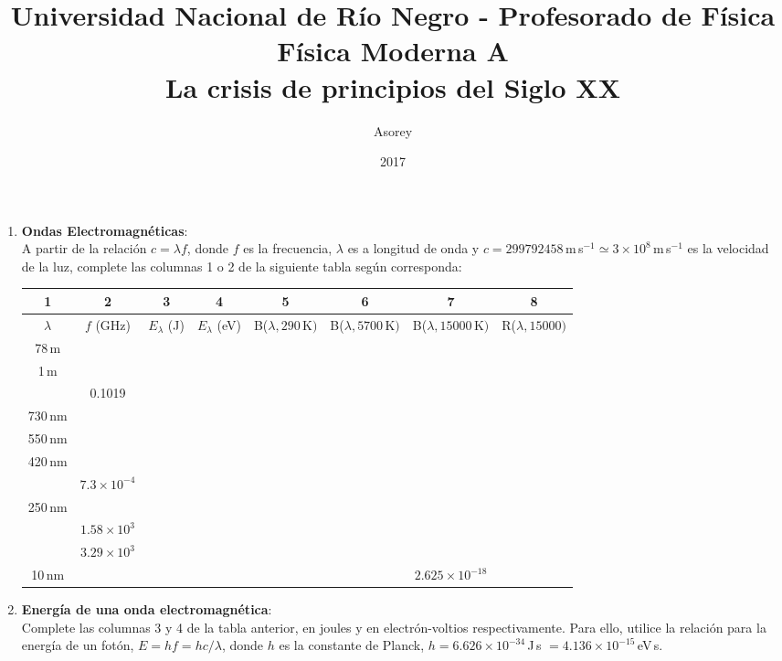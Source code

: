 \documentclass[a4paper,12pt]{article}
\begin{document}
\title{
{\normalsize{Universidad Nacional de Río Negro - Profesorado de Física}}\\
Física Moderna A \\ La crisis de principios del Siglo XX\\}
\author{Asorey}
\date{2017}
\maketitle

\begin{enumerate}
\setcounter{enumi}{0}      %

\item {\bf{Ondas Electromagnéticas}}:\\
	A partir de la relación $c = \lambda f$, donde $f$ es la frecuencia,
		$\lambda$ es a longitud de onda y $c=299792458$\,m\,s$^{-1} \simeq
		3\times 10^8$\,m\,s$^{-1}$ es la velocidad de la luz, complete las columnas 1 o 2 de la siguiente tabla según corresponda:
		\begin{center}
			\begin{tabular}{|c|c|c|c|c|c|c|c|}
				\hline
				1 & 2 & 3 & 4 & 5 & 6 & 7 & 8 \\
				\hline
				$\lambda$ & $f$ (GHz) & $E_\lambda$ (J) & $E_\lambda$ (eV) & B($\lambda, 290$\,K$)$ & B($\lambda, 5700$\,K$)$ & B($\lambda, 15000$\,K$)$ & R($\lambda,15000)$\\
				\hline
				78\,m & & & & & & & \\
				\hline
				1\,m & & & & & & & \\
				\hline
				 & 0.1019 & & & & & & \\
				\hline
				730\,nm & & & & & & & \\
				\hline
				550\,nm & & & & & & & \\
				\hline
				420\,nm & & & & & & & \\
				\hline
				& $7.3 \times 10^{-4}$ & & & & & & \\
				\hline
				250\,nm & & & & & & & \\
				\hline
				& $1.58 \times 10^{3}$ & & & & & & \\
				\hline
				& $3.29 \times 10^{3}$ & & & & & & \\
				\hline
				10\,nm & & & & & & $2.625 \times 10^{-18}$ & \\
				\hline
			\end{tabular}
		\end{center}
		
\item {\bf{Energía de una onda electromagnética}}:\\
	Complete las columnas 3 y 4 de la tabla anterior, en joules y en
		electrón-voltios respectivamente. Para ello, utilice la relación para
		la energía de un fotón, $E = h f = h c / \lambda$, donde $h$ es la
		constante de Planck, $h=6.626\times 10^{-34}$\,J\,s $=4.136\times
		10^{-15}$\,eV\,s.


\end{enumerate}
\end{document}
